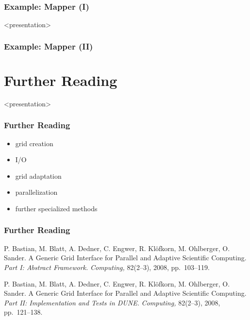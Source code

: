 \documentclass[ignorenonframetext,11pt]{beamer}
\theoremstyle{definition}
\newenvironment{codeblock}{%
  \begin{tcolorbox}[size=small,oversize,boxrule=0pt,opacityframe=0,colback=blue!30!black!5!white]}{%
  \end{tcolorbox}}
\begin{document}
\begin{frame} \frametitle{Example: Mapper (I)}
\scriptsize
\begin{codeblock}
  
\end{codeblock}
\end{frame}

\begin{onlyenv}<presentation>
\begin{frame} \frametitle{Example: Mapper (II)}
\scriptsize
\begin{codeblock}
  
\end{codeblock}
\end{frame}
\end{onlyenv}

\section{Further Reading}

\begin{onlyenv}<presentation>
  \begin{frame}
    \frametitle{Further Reading}
    \begin{itemize}
    \item grid creation
      \medskip
    \item I/O
      \medskip
    \item grid adaptation
      \medskip
    \item parallelization
      \medskip
    \item further specialized methods
    \end{itemize}
  \end{frame}
\end{onlyenv}

\begin{frame} \frametitle<presentation>{Further Reading}
  \begin{thebibliography}{}

P. Bastian, M. Blatt, A. Dedner, C. Engwer, R. Klöfkorn, M. Ohlberger,
O. Sander.
\newblock A Generic Grid Interface for Parallel and Adaptive
Scientific Computing.
\emph{Part I: Abstract Framework.}
\newblock \emph{Computing,} 82(2--3), 2008, pp.~103--119.

P. Bastian, M. Blatt, A. Dedner, C. Engwer, R. Klöfkorn, M. Ohlberger,
O. Sander.
\newblock A Generic Grid Interface for Parallel and Adaptive
Scientific Computing.
\emph{Part II: Implementation and Tests in DUNE.}
\newblock \emph{Computing,} 82(2--3), 2008, pp.~121--138.

\end{thebibliography}
\end{frame}
\end{document}

